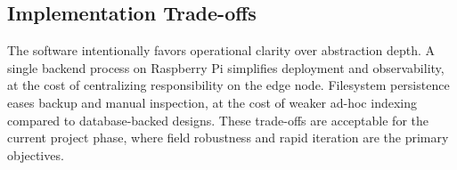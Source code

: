 \subsection{Implementation Trade-offs}
The software intentionally favors operational clarity over abstraction depth. A single backend process on Raspberry Pi simplifies deployment and observability, at the cost of centralizing responsibility on the edge node. Filesystem persistence eases backup and manual inspection, at the cost of weaker ad-hoc indexing compared to database-backed designs. These trade-offs are acceptable for the current project phase, where field robustness and rapid iteration are the primary objectives.
